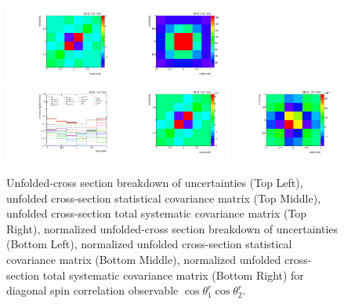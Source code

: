 \begin{refsection}
\begin{figure}[htb]
\begin{center}
 \includegraphics[width=0.32\textwidth]{fig_fullRun2UL/unfolding/combined/StatCovMatrix_rebinnedB_c_rr.pdf}
 \includegraphics[width=0.32\textwidth]{fig_fullRun2UL/unfolding/combined/TotalSystCovMatrix_rebinnedB_c_rr.pdf} \\
 \includegraphics[width=0.32\textwidth]{fig_fullRun2UL/unfolding/combined/deltaSystCombinedlogNorm_rebinnedB_c_rr.pdf}
 \includegraphics[width=0.32\textwidth]{fig_fullRun2UL/unfolding/combined/StatCovMatrixNorm_rebinnedB_c_rr.pdf}
 \includegraphics[width=0.32\textwidth]{fig_fullRun2UL/unfolding/combined/TotalSystCovMatrixNorm_rebinnedB_c_rr.pdf} \\
\caption{Unfolded-cross section breakdown of uncertainties (Top Left), unfolded cross-section statistical covariance matrix (Top Middle), unfolded cross-section total systematic covariance matrix (Top Right), normalized unfolded-cross section breakdown of uncertainties (Bottom Left), normalized unfolded cross-section statistical covariance matrix (Bottom Middle), normalized unfolded cross-section total systematic covariance matrix (Bottom Right) for diagonal spin correlation observable $\cos\theta_{1}^{r}\cos\theta_{2}^{r}$.}

\end{center}
\end{figure}
\end{refsection}
